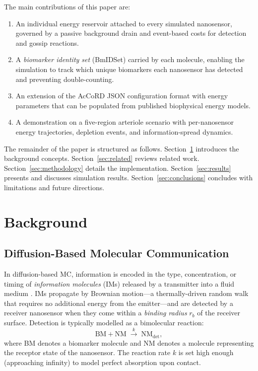 \documentclass[journal]{IEEEtran}
\begin{document}
The main contributions of this paper are:
\begin{enumerate}
  \item An individual energy reservoir attached to every simulated nanosensor,
        governed by a passive background drain and event-based costs for
        detection and gossip reactions.
  \item A \emph{biomarker identity set} (BmIDSet) carried by each molecule,
        enabling the simulation to track which unique biomarkers each nanosensor
        has detected and preventing double-counting.
  \item An extension of the AcCoRD JSON configuration format with energy
        parameters that can be populated from published biophysical energy
        models.
  \item A demonstration on a five-region arteriole scenario with per-nanosensor
        energy trajectories, depletion events, and information-spread dynamics.
\end{enumerate}

The remainder of the paper is structured as follows. Section~\ref{sec:background}
introduces the background concepts. Section~\ref{sec:related} reviews related
work. Section~\ref{sec:methodology} details the implementation.
Section~\ref{sec:results} presents and discusses simulation results.
Section~\ref{sec:conclusions} concludes with limitations and future directions.

\section{Background}
\label{sec:background}

\subsection{Diffusion-Based Molecular Communication}

In diffusion-based MC, information is encoded in the type, concentration, or
timing of \emph{information molecules} (IMs) released by a transmitter into a
fluid medium \cite{nakano2013molecular}. IMs propagate by Brownian
motion---a thermally-driven random walk that requires no additional energy from
the emitter---and are detected by a receiver nanosensor when they come within
a \emph{binding radius} $r_b$ of the receiver surface. Detection is typically
modelled as a bimolecular reaction:
\begin{equation}
  \mathrm{BM} + \mathrm{NM} \;\xrightarrow{k}\; \mathrm{NM}_{\mathrm{det}},
  \label{eq:detection}
\end{equation}
where BM denotes a biomarker molecule and NM denotes a molecule representing
the receptor state of the nanosensor. The reaction rate $k$ is set high enough
(approaching infinity) to model perfect absorption upon contact.
\end{document}
